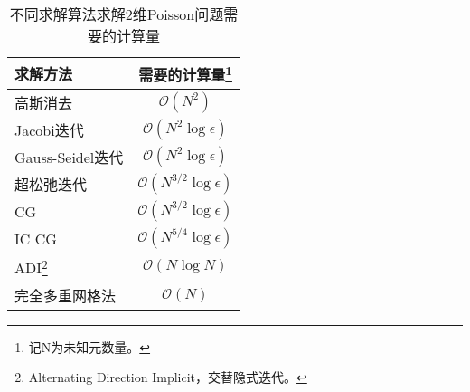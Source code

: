\begin{table}
\centering
\caption{不同求解算法求解2维Poisson问题需要的计算量\cite{trottenberg2000multigrid}}
\begin{minipage}{.7\linewidth}
\centering
\begin{tabular}{lc}
\toprule
求解方法 & 需要的计算量\footnote{记N为未知元数量。}\\
\midrule
高斯消去 & $\mathcal{O}(N^2)$\\
Jacobi迭代 & $\mathcal{O}(N^2\log\epsilon)$\\
Gauss-Seidel迭代 & $\mathcal{O}(N^2\log\epsilon)$\\
超松弛迭代 & $\mathcal{O}(N^{3/2}\log\epsilon)$\\
CG & $\mathcal{O}(N^{3/2}\log\epsilon)$\\
IC CG & $\mathcal{O}(N^{5/4}\log\epsilon)$\\
ADI\footnote{Alternating Direction Implicit，交替隐式迭代。} & $\mathcal{O}(N\log N)$\\
完全多重网格法 & $\mathcal{O}(N)$\\
\bottomrule
\end{tabular}
\end{minipage}
\end{table}
